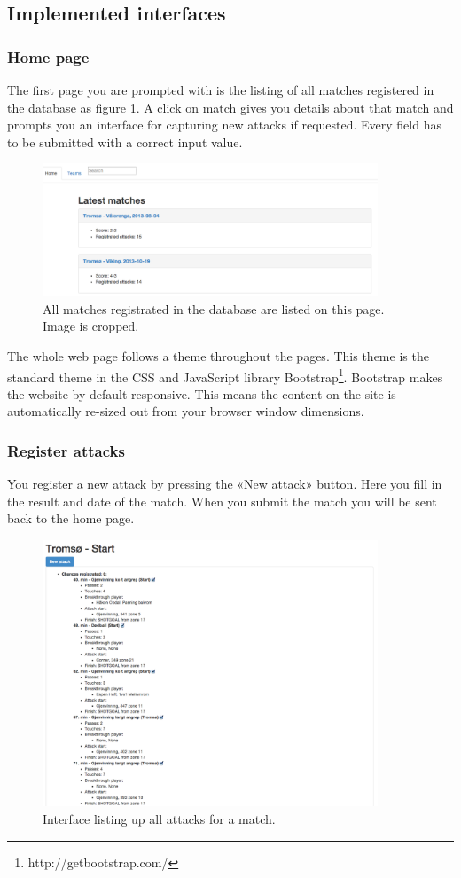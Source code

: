 \subsection{Implemented interfaces}

\subsubsection{Home page}
The first page you are prompted with is the listing of all matches registered in the database as figure \ref{fig:all_matches}. A click on match gives you details about that match and prompts you an interface for capturing new attacks if requested. Every field has to be submitted with a correct input value.

\begin{figure}[ht!]
\centering
\includegraphics[width=100mm]{images/interfaces/all_matches.png}
\caption{All matches registrated in the database are listed on this page. Image is cropped.}
\label{fig:all_matches}
\end{figure}

The whole web page follows a theme throughout the pages. This theme is the standard theme in the \ac{CSS} and JavaScript library Bootstrap\footnote{ http://getbootstrap.com/}. Bootstrap makes the website by default responsive. This means the content on the site is automatically re-sized out from your browser window dimensions.

\subsubsection{Register attacks}
You register a new attack by pressing the «New attack» button. Here you fill in the result and date of the match. When you submit the match you will be sent back to the home page. 

\begin{figure}[ht!]
\centering
\includegraphics[width=100mm]{images/general/all_attacks.png}
\caption{Interface listing up all attacks for a match.}
\label{fig:all_attacks}
\end{figure}


